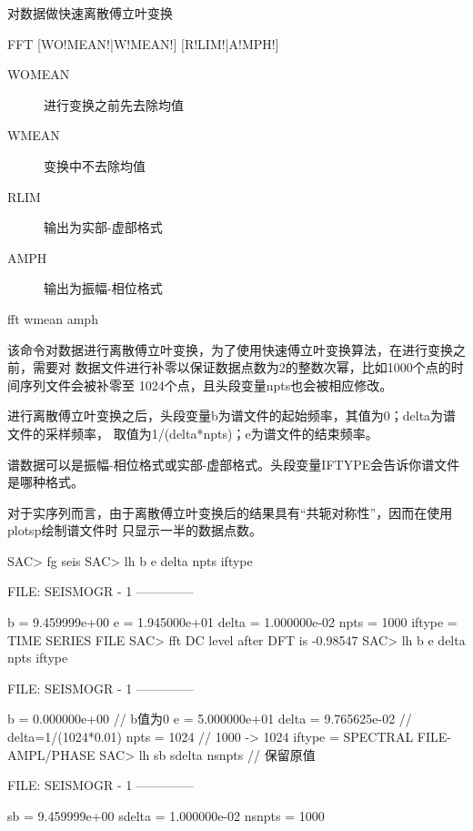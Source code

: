 \label{cmd:fft}

对数据做快速离散傅立叶变换

\begin{SACSTX}
FFT [WO!MEAN!|W!MEAN!] [R!LIM!|A!MPH!]
\end{SACSTX}

\begin{description}
\item [WOMEAN] 进行变换之前先去除均值
\item [WMEAN] 变换中不去除均值
\item [RLIM] 输出为实部-虚部格式
\item [AMPH] 输出为振幅-相位格式
\end{description}

\begin{SACDFT}
fft wmean amph
\end{SACDFT}

该命令对数据进行离散傅立叶变换，为了使用快速傅立叶变换算法，在进行变换之前，需要对
数据文件进行补零以保证数据点数为2的整数次幂，比如1000个点的时间序列文件会被补零至
1024个点，且头段变量npts也会被相应修改。

进行离散傅立叶变换之后，头段变量b为谱文件的起始频率，其值为0；delta为谱文件的采样频率，
取值为1/(delta*npts)；e为谱文件的结束频率。

谱数据可以是振幅-相位格式或实部-虚部格式。头段变量IFTYPE会告诉你谱文件是哪种格式。

对于实序列而言，由于离散傅立叶变换后的结果具有“共轭对称性”，因而在使用plotsp绘制谱文件时
只显示一半的数据点数。

\begin{SACCode}
SAC> fg seis
SAC> lh b e delta npts iftype
  
  FILE: SEISMOGR - 1
 --------------

          b = 9.459999e+00
          e = 1.945000e+01
      delta = 1.000000e-02
       npts = 1000
     iftype = TIME SERIES FILE
SAC> fft
 DC level after DFT is -0.98547
SAC> lh b e delta npts iftype
  
  FILE: SEISMOGR - 1
 --------------

          b = 0.000000e+00              // b值为0
          e = 5.000000e+01                  
      delta = 9.765625e-02              // delta=1/(1024*0.01)
       npts = 1024                      // 1000 -> 1024
     iftype = SPECTRAL FILE-AMPL/PHASE
SAC> lh sb sdelta nsnpts                // 保留原值
  
  FILE: SEISMOGR - 1
 --------------

         sb = 9.459999e+00
     sdelta = 1.000000e-02
     nsnpts = 1000
\end{SACCode}

